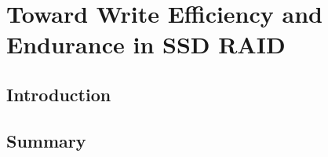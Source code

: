 \chapter{Toward Write Efficiency and Endurance in SSD RAID}
\label{chap:tween}

\section{Introduction}




\section{Summary}

